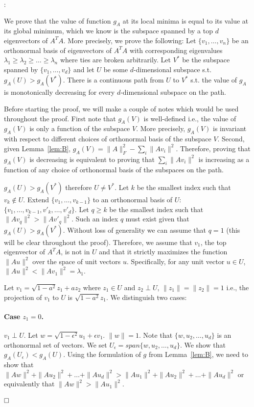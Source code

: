 \documentclass{article}
\newenvironment{proofof}[1]{\smallskip\noindent{\bf Proof of #1}:}{$\hfill \Box$\\}
\begin{document}
\begin{proofof}{Lemma~\ref{lem:C}}

We prove that the value of function $g_A$ at its local minima is equal to its value at its global minimum, which we know is the subspace spanned by a top $d$ eigenvectors of $A^TA$. More precisely, we prove the following: Let $\{v_1, \ldots, v_n\}$ be an orthonormal basis of eigenvectors of
$A^TA$ with corresponding eigenvalues
$\lambda_1 \geq \lambda_2 \geq \ldots \geq \lambda_n$ where ties are
broken arbitrarily. Let $V^*$ be the subspace spanned by
$\{v_1,\ldots, v_d\}$ and let $U$ be some $d$-dimensional subspace
s.t. $g_A(U) > g_A(V^*)$. There is a continuous path from $U$ to $V^*$
s.t. the value of $g_A$
is monotonically decreasing for every $d$-dimensional subspace on the path.


Before starting the proof, we will make a couple of notes which would be used throughout the proof. First note that $g_A(V)$ is well-defined i.e., the value of $g_A(V)$ is only a function of the subspace $V$. More precisely, $g_A(V)$ is invariant with respect to different choices of orthonormal basis of the subspace $V$. Second, given Lemma~\ref{lem:B}, $g_A(V) = \|A\|_F^2 - \sum_{i}\|Av_i\|^2$. Therefore, proving that $g_A(V)$ is decreasing is equivalent to proving that $\sum_i \|Av_i\|^2$ is increasing as a function of any choice of orthonormal basis of the subspaces on the path.

$g_A(U) > g_A(V^*)$ therefore $U\neq V^*$. Let $k$ be the smallest index such that $v_k \notin U$. Extend $\{v_1,\ldots, v_{k-1}\}$ to an orthonormal basis of $U$: $\{v_1, \ldots, v_{k-1}, v'_k, \ldots, v'_d\}$. Let $q \geq k$ be the smallest index such that $\|Av_q\|^2 > \|Av'_q\|^2$. Such an index $q$ must exist given that $g_A(U)> g_A(V^*)$. Without loss of generality we can assume that $q=1$ (this will be clear throughout the proof). Therefore, we assume that $v_1$, the top eigenvector of $A^TA$, is not in $U$ and that it strictly maximizes the function $\|Au\|^2$ over the space of unit vectors $u$. Specifically, for any unit vector $u\in U$, $\|Au\|^2<  \|Av_1\|^2 = \lambda_1$.

Let $v_1 = \sqrt{1-a^2}z_1 + az_2$ where $z_1 \in U$ and $z_2 \perp U$, $\|z_1\|=\|z_2\|=1$ i.e., the projection of $v_1$ to $U$ is $\sqrt{1-a^2}z_1$. We distinguish two cases:

\paragraph{Case \boldmath $z_1 = 0$.} $v_1\perp U$. Let $w = \sqrt{1-\epsilon^2} u_1 + \epsilon v_1$. $\|w\|=1$. Note that $\{w, u_2, \ldots, u_d\}$ is an orthonormal set of vectors. We set $U_{\epsilon}= span\{w, u_2, \ldots, u_d\}$. We show that $g_A(U_\epsilon) < g_A (U)$. Using the formulation of $g$ from Lemma~\ref{lem:B}, we need to show that $\|Aw\|^2 + \|Au_2\|^2+\ldots+\|Au_d\|^2 > \|Au_1\|^2+\|Au_2\|^2+\ldots + \|Au_d\|^2$ or equivalently that $\|Aw\|^2 > \|Au_1\|^2$.


\end{proofof}
\end{document}

